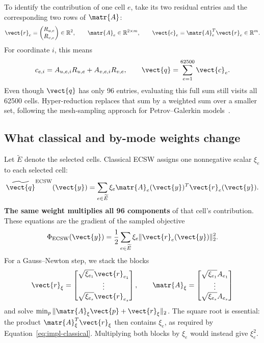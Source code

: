 To identify the contribution of one cell $e$, take its two residual entries and the corresponding two rows of $\matr{A}$:
\begin{equation}
 \vect{r}_e=\begin{pmatrix}R_{u,e}\\R_{v,e}\end{pmatrix}\in\mathbb R^2,
 \qquad \matr{A}_e\in\mathbb R^{2\times m},
 \qquad \vect{c}_e=\matr{A}_e^T\vect{r}_e\in\mathbb R^m.
 \label{eq:impl-cell}
\end{equation}
For coordinate $i$, this means
\begin{equation}
 c_{e,i}=A_{u,e,i}R_{u,e}+A_{v,e,i}R_{v,e},\qquad
 \vect{q}=\sum_{e=1}^{62500}\vect{c}_e.
 \label{eq:impl-cell-component}
\end{equation}
Even though $\vect{q}$ has only 96 entries, evaluating this full sum still visits all 62500 cells. Hyper-reduction replaces that sum by a weighted sum over a smaller set, following the mesh-sampling approach for Petrov--Galerkin models~\cite{impl-grimberg2021}.

\subsection{What classical and by-mode weights change}
\label{sec:impl-weights}

Let $\widetilde E$ denote the selected cells. Classical ECSW assigns one nonnegative scalar $\xi_e$ to each selected cell:
\begin{equation}
 \widetilde{\vect{q}}^{\mathrm{ECSW}}(\vect{y})
 =\sum_{e\in\widetilde E}\xi_e \matr{A}_e(\vect{y})^T\vect{r}_e(\vect{y}).
 \label{eq:impl-classical}
\end{equation}
\textbf{The same weight multiplies all 96 components} of that cell's contribution. These equations are the gradient of the sampled objective
\begin{equation}
 \Phi_{\mathrm{ECSW}}(\vect{y})
 =\frac12\sum_{e\in\widetilde E}\xi_e\|\vect{r}_e(\vect{y})\|_2^2.
 \label{eq:impl-classical-objective}
\end{equation}
For a Gauss--Newton step, we stack the blocks
\begin{equation}
 \vect{r}_\xi=\begin{bmatrix}\sqrt{\xi_{e_1}}\vect{r}_{e_1}\\\vdots\\\sqrt{\xi_{e_s}}\vect{r}_{e_s}\end{bmatrix},
 \qquad
 \matr{A}_\xi=\begin{bmatrix}\sqrt{\xi_{e_1}}A_{e_1}\\\vdots\\\sqrt{\xi_{e_s}}A_{e_s}\end{bmatrix}
\end{equation}
and solve $\min_p\|\matr{A}_\xi \vect{p}+\vect{r}_\xi\|_2$. The square root is essential: the product $\matr{A}_\xi^T\vect{r}_\xi$ then contains $\xi_e$, as required by Equation~\eqref{eq:impl-classical}. Multiplying both blocks by $\xi_e$ would instead give $\xi_e^2$.

